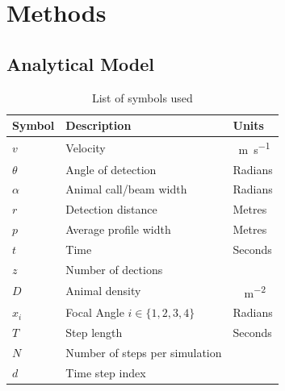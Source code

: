 \documentclass[a4paper,10pt,reqno,oneside]{amsart}
\begin{document}

\section{Methods}

\subsection{Analytical Model}



\begin{table}[t]
\centering
\begin{tabular}{lll}
Symbol 	& Description & Units\\\hline
$v$		& Velocity & \SI{}{\meter\per\second}\\
$\theta$	& Angle of detection & Radians \\
$\alpha$	& Animal call/beam width & Radians \\
$r$ 		& Detection distance & Metres\\
$p$ 		& Average profile width & Metres\\
$t$		& Time & Seconds\\
$z$		& Number of dections & \\
$D$		& Animal density & \SI{}{\animals\per\meter\squared} \\
$x_i$	        & Focal Angle $i \in \{1,2,3,4\} $ 	& Radians\\
$T$ 		& Step length & Seconds\\
$N$ 		& Number of steps per simulation & \\
$d$ 		& Time step index &

\end{tabular}
\caption{List of symbols used}
\label{t:paras}
\end{table}
\end{document}

